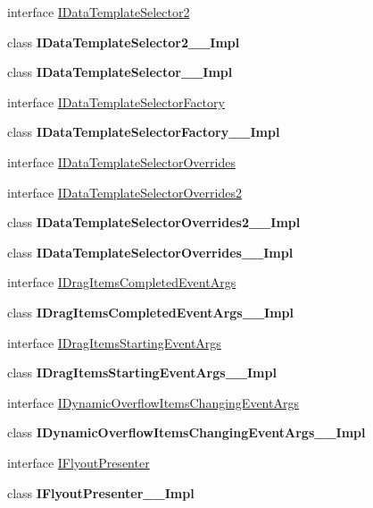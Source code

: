 \begin{DoxyCompactItemize}
\item 
interface \hyperlink{interface_windows_1_1_u_i_1_1_xaml_1_1_controls_1_1_i_data_template_selector2}{I\+Data\+Template\+Selector2}
\item 
class {\bfseries I\+Data\+Template\+Selector2\+\_\+\+\_\+\+Impl}
\item 
class {\bfseries I\+Data\+Template\+Selector\+\_\+\+\_\+\+Impl}
\item 
interface \hyperlink{interface_windows_1_1_u_i_1_1_xaml_1_1_controls_1_1_i_data_template_selector_factory}{I\+Data\+Template\+Selector\+Factory}
\item 
class {\bfseries I\+Data\+Template\+Selector\+Factory\+\_\+\+\_\+\+Impl}
\item 
interface \hyperlink{interface_windows_1_1_u_i_1_1_xaml_1_1_controls_1_1_i_data_template_selector_overrides}{I\+Data\+Template\+Selector\+Overrides}
\item 
interface \hyperlink{interface_windows_1_1_u_i_1_1_xaml_1_1_controls_1_1_i_data_template_selector_overrides2}{I\+Data\+Template\+Selector\+Overrides2}
\item 
class {\bfseries I\+Data\+Template\+Selector\+Overrides2\+\_\+\+\_\+\+Impl}
\item 
class {\bfseries I\+Data\+Template\+Selector\+Overrides\+\_\+\+\_\+\+Impl}
\item 
interface \hyperlink{interface_windows_1_1_u_i_1_1_xaml_1_1_controls_1_1_i_drag_items_completed_event_args}{I\+Drag\+Items\+Completed\+Event\+Args}
\item 
class {\bfseries I\+Drag\+Items\+Completed\+Event\+Args\+\_\+\+\_\+\+Impl}
\item 
interface \hyperlink{interface_windows_1_1_u_i_1_1_xaml_1_1_controls_1_1_i_drag_items_starting_event_args}{I\+Drag\+Items\+Starting\+Event\+Args}
\item 
class {\bfseries I\+Drag\+Items\+Starting\+Event\+Args\+\_\+\+\_\+\+Impl}
\item 
interface \hyperlink{interface_windows_1_1_u_i_1_1_xaml_1_1_controls_1_1_i_dynamic_overflow_items_changing_event_args}{I\+Dynamic\+Overflow\+Items\+Changing\+Event\+Args}
\item 
class {\bfseries I\+Dynamic\+Overflow\+Items\+Changing\+Event\+Args\+\_\+\+\_\+\+Impl}
\item 
interface \hyperlink{interface_windows_1_1_u_i_1_1_xaml_1_1_controls_1_1_i_flyout_presenter}{I\+Flyout\+Presenter}
\item 
class {\bfseries I\+Flyout\+Presenter\+\_\+\+\_\+\+Impl}

\end{DoxyCompactItemize}
